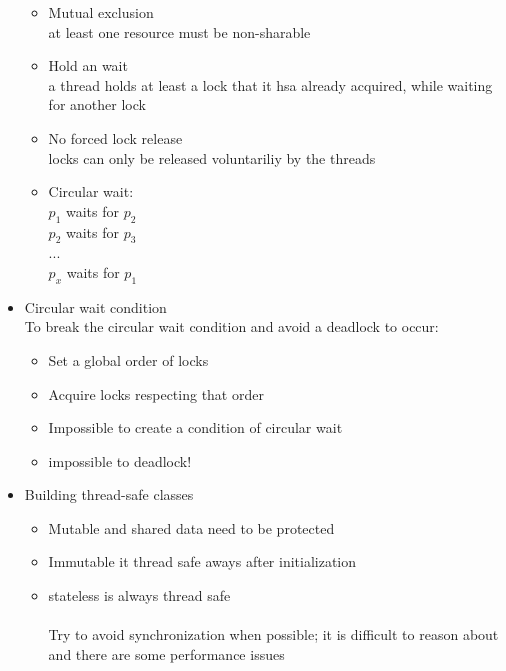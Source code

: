 \documentclass[a4paper]{article}
\begin{document}
\begin{itemize}
			\begin{itemize}
				\item Mutual exclusion \\at least one resource must be non-sharable
				\item Hold an wait \\a thread holds at least a lock that it hsa already acquired, while waiting for another lock
				\item No forced lock release \\ locks can only be released voluntariliy by the threads
				\item Circular wait:
				\\$p_1$ waits for $p_2$
				\\$p_2$ waits for $p_3$
				\\...
				\\$p_x$ waits for $p_1$
			\end{itemize}
		\item Circular wait condition
		\\To break the circular wait condition and avoid a deadlock to occur:
			\begin{itemize}
				\item Set a global order of locks
				\item Acquire locks respecting that order
				\item Impossible to create a condition of circular wait
				\item impossible to deadlock!
			\end{itemize}
		\item Building thread-safe classes
			\begin{itemize}
				\item Mutable and shared data need to be protected
				\item Immutable it thread safe aways after initialization
				\item stateless is always thread safe
				\\
				\\Try to avoid synchronization when possible; it is difficult to reason about and there are some performance issues


\end{itemize}
\end{itemize}
\end{document}
